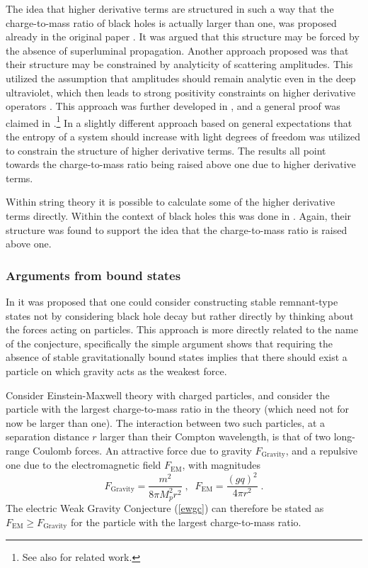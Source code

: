 \documentclass[11pt,a4paper]{article}
\numberwithin{equation}{section}
\numberwithin{table}{section}\setlength{\multlinegap}{25pt}
\newcommand{\be}{\begin{equation}}
\newcommand{\ee}{\end{equation}}
\begin{document}
The idea that higher derivative terms are structured in such a way that the charge-to-mass ratio of black holes is actually larger than one, was proposed already in the original paper \cite{ArkaniHamed:2006dz}. It was argued that this structure may be forced by the absence of superluminal propagation. Another approach proposed was that their structure may be constrained by analyticity of scattering amplitudes. This utilized the assumption that amplitudes should remain analytic even in the deep ultraviolet, which then leads to strong positivity constraints on higher derivative operators \cite{Adams:2006sv}. This approach was further developed in \cite{Cheung:2014ega,Cheung:2016wjt,Hamada:2018dde}, and a general proof was claimed in \cite{Bellazzini:2019xts}.\footnote{See also \cite{Chen:2019qvr} for related work.} In \cite{Cheung:2018cwt,Cheung:2019cwi} a slightly different approach based on general expectations that the entropy of a system should increase with light degrees of freedom was utilized to constrain the structure of higher derivative terms. The results all point towards the charge-to-mass ratio being raised above one due to higher derivative terms. 

Within string theory it is possible to calculate some of the higher derivative terms directly. Within the context of black holes this was done in \cite{Kats:2006xp,Giveon:2009da}. Again, their structure was found to support the idea that the charge-to-mass ratio is raised above one. 

\subsubsection{Arguments from bound states}
\label{sec:bstates}

In \cite{ArkaniHamed:2006dz} it was proposed that one could consider constructing stable remnant-type states not by considering black hole decay but rather directly by thinking about the forces acting on particles. This approach is more directly related to the name of the conjecture, specifically the simple argument shows that requiring the absence of stable gravitationally bound states implies that there should exist a particle on which gravity acts as the weakest force. 

Consider Einstein-Maxwell theory with charged particles, and consider the particle with the largest charge-to-mass ratio in the theory (which need not for now be larger than one). The interaction between two such particles, at a separation distance $r$ larger than their Compton wavelength, is that of two long-range Coulomb forces. An attractive force due to gravity $F_{\mathrm{Gravity}}$, and a repulsive one due to the electromagnetic field $F_{\mathrm{EM}}$, with magnitudes 
\be
\label{graemfroc}
F_{\mathrm{Gravity}} = \frac{m^2}{8 \pi M_p^2 r^2} \;, \;\; F_{\mathrm{EM}} = \frac{\left(g q \right)^2}{ 4 \pi r^2} \;.
\ee
The electric Weak Gravity Conjecture (\ref{ewgc}) can therefore be stated as $F_{\mathrm{EM}} \geq F_{\mathrm{Gravity}}$ for the particle with the largest charge-to-mass ratio. 
\end{document}
